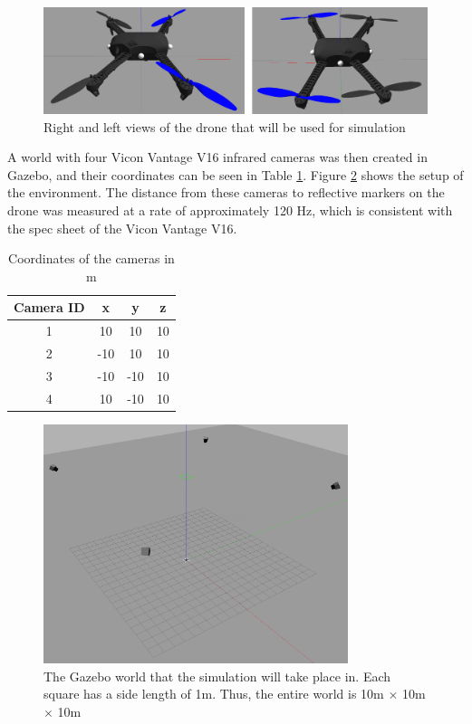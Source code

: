 \documentclass[letterpaper, preprint, paper,11pt]{AAS}	%
\begin{document}
\begin{figure}[htb]
	\centering\includegraphics[width=5in]{Figures/DroneModel}
	\caption{Right and left views of the drone that will be used for simulation}
	\label{fig:DroneModel}
\end{figure}

A world with four Vicon Vantage V16 infrared cameras\cite{vicon_2022} was then created in Gazebo, and their coordinates can be seen in Table \ref{tab:cameras}. Figure \ref{fig:GazeboWorld} shows the setup of the environment. The distance from these cameras to reflective markers on the drone was measured at a rate of approximately 120 Hz, which is consistent with the spec sheet of the Vicon Vantage V16\cite{vicon_2022}.

\begin{table}[htbp]
	\fontsize{10}{10}\selectfont
    \caption{Coordinates of the cameras in m}
   \label{tab:cameras}
        \centering 
   \begin{tabular}{c | c | c | c} %
      \hline 
      Camera ID    & x & y & z \\
      \hline 
      1      & 10 & 10 & 10 \\
      2      & -10 & 10 & 10 \\
      3      & -10 & -10 & 10 \\
      4      & 10 & -10 & 10 \\
      \hline
   \end{tabular}
\end{table}

\begin{figure}[htb]
	\centering\includegraphics[width=3.5in]{Figures/GazeboWorld}
	\caption{The Gazebo world that the simulation will take place in. Each square has a side length of 1m. Thus, the entire world is 10m $\times$ 10m $\times$ 10m}
	\label{fig:GazeboWorld}
\end{figure}
\end{document}
